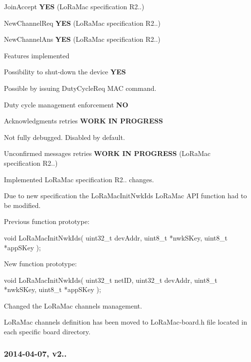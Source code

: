 \begin{DoxyItemize}
\begin{DoxyEnumerate}
\begin{DoxyItemize}
\item Join\+Accept {\bfseries Y\+ES} (Lo\+Ra\+Mac specification R2..)
\item New\+Channel\+Req {\bfseries Y\+ES} (Lo\+Ra\+Mac specification R2..)
\item New\+Channel\+Ans {\bfseries Y\+ES} (Lo\+Ra\+Mac specification R2..)
\end{DoxyItemize}
\item Features implemented
\begin{DoxyItemize}
\item Possibility to shut-\/down the device {\bfseries Y\+ES}

Possible by issuing Duty\+Cycle\+Req M\+AC command.
\item Duty cycle management enforcement {\bfseries NO}
\item Acknowledgments retries {\bfseries W\+O\+RK IN P\+R\+O\+G\+R\+E\+SS}

Not fully debugged. Disabled by default.
\item Unconfirmed messages retries {\bfseries W\+O\+RK IN P\+R\+O\+G\+R\+E\+SS} (Lo\+Ra\+Mac specification R2..)
\end{DoxyItemize}
\item Implemented Lo\+Ra\+Mac specification R2.. changes.
\item Due to new specification the Lo\+Ra\+Mac\+Init\+Nwk\+Ids Lo\+Ra\+Mac A\+PI function had to be modified.

Previous function prototype\+: \begin{DoxyVerb} void LoRaMacInitNwkIds( uint32_t devAddr, uint8_t *nwkSKey, uint8_t *appSKey );
\end{DoxyVerb}


New function prototype\+: \begin{DoxyVerb} void LoRaMacInitNwkIds( uint32_t netID, uint32_t devAddr, uint8_t *nwkSKey, uint8_t *appSKey );
\end{DoxyVerb}

\item Changed the Lo\+Ra\+Mac channels management.
\item Lo\+Ra\+Mac channels definition has been moved to Lo\+Ra\+Mac-\/board.\+h file located in each specific board directory.
\end{DoxyEnumerate}
\end{DoxyItemize}

\subsubsection*{2014-\/04-\/07, v2..}


